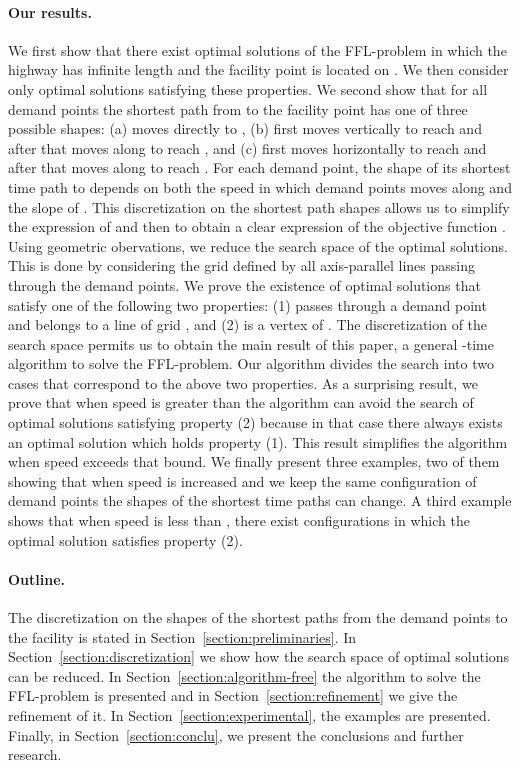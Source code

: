\documentclass[11pt,a4paper,oneside,onecolumn]{article}
\begin{document}
\paragraph{Our results.}
We first show that there exist
optimal solutions of the FFL-problem in which the highway  has
infinite length and the facility point  is located on . We
then consider only optimal solutions satisfying these properties. We
second show that for all demand points  the shortest path
from  to the facility point  has one of three possible shapes:
(a)  moves directly to , (b)  first moves vertically to
reach  and after that moves along  to reach , and (c) 
first moves horizontally to reach  and after that moves along 
to reach . For each demand point, the shape of its shortest time
path to  depends on both the speed  in which demand points
moves along  and the slope of . This discretization on the
shortest path shapes allows us to simplify the expression of
 and then to obtain a clear
expression of the objective function . 
Using geometric obervations, we reduce the search space of the optimal solutions. This is
done by considering
the grid  defined by all axis-parallel lines passing through the
demand points. 
We prove the existence of optimal solutions 
that satisfy one of the following two properties: (1)  passes
through a demand point and  belongs to a line of grid , and
(2)  is a vertex of . The discretization of the search space
permits us to obtain the main result of this paper, a general
-time algorithm to solve the FFL-problem. Our algorithm
divides the search into two cases that correspond to the above two
properties. As a surprising result, we prove that when speed  is
greater than  the algorithm
can avoid the search of optimal solutions satisfying property (2)
because in that case there always exists an optimal solution which
holds property (1). This result simplifies the algorithm when speed
exceeds that bound. We finally present three examples,
two of them showing that when speed is increased and we keep the
same configuration of demand points the shapes of the shortest time
paths can change. A third example shows that when speed is less
than , there exist configurations in which the
optimal solution satisfies property (2).

\paragraph{Outline.}
The discretization on the shapes of the shortest paths from the
demand points to the facility is stated in Section~\ref{section:preliminaries}.
In Section~\ref{section:discretization} we show how the search
space of optimal solutions can be reduced.
In Section~\ref{section:algorithm-free} the algorithm to solve 
the FFL-problem is presented and in Section~\ref{section:refinement} we give the
refinement of it. In Section~\ref{section:experimental}, the examples are presented.
Finally, in Section~\ref{section:conclu}, we present the conclusions
and further research.
\end{document}
